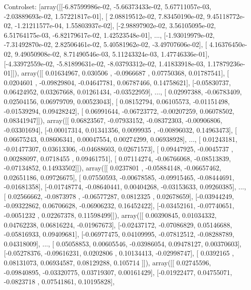 \documentclass{article}
\begin{document}
Controlset: [array([[-6.87599986e-02, -5.66373433e-02,  5.67711057e-03,
        -2.03889693e-02,  1.57221817e-01],
       [ 2.08819512e-02,  7.83450190e-02,  9.45118772e-02,
        -1.21211577e-04,  1.55803937e-02],
       [-2.98897902e-02,  3.56105095e-02,  6.51764175e-03,
        -6.82179617e-02,  1.42523548e-01],
       ...,
       [-1.93019979e-02, -7.31492870e-02,  2.82506461e-02,
         5.40581962e-02, -3.49707606e-02],
       [ 4.16376450e-02,  9.49050908e-02,  8.71490546e-03,
         5.11243324e-03,  1.47746336e-01],
       [-4.33972559e-02, -5.81899631e-02, -8.03793312e-02,
         1.41833918e-03,  1.17879236e-01]]), array([[ 0.01634967,  0.030506  , -0.0966687 ,  0.07750368,  0.01787541],
       [ 0.0204601 , -0.09829804, -0.04647781,  0.06787466,  0.14758621],
       [-0.05830737,  0.06424952,  0.03267668,  0.01261434, -0.03522959],
       ...,
       [ 0.02997388, -0.06783409,  0.02504156,  0.06979709,  0.00523043],
       [ 0.08152794,  0.06105573, -0.01151498, -0.01539294,  0.09428242],
       [ 0.06991644, -0.06723772, -0.00207259,  0.06078502,  0.08341947]]), array([[ 0.06823567, -0.07933152, -0.08372303, -0.00906806, -0.03301694],
       [-0.00017314,  0.01341356,  0.0099935 , -0.00896032,  0.14963473],
       [ 0.06675243,  0.08606341,  0.00047554,  0.00274299,  0.06938928],
       ...,
       [ 0.01243181, -0.01477307,  0.03613306, -0.04688603,  0.02671573],
       [ 0.09447925, -0.0045737 ,  0.00288097,  0.0718455 ,  0.09461751],
       [ 0.07114274, -0.06766068, -0.08513839, -0.07134852,  0.14933502]]), array([[ 0.0237801 , -0.05884148, -0.06657462,  0.02651186,  0.09726675],
       [ 0.07550593, -0.00678585, -0.09915465, -0.08444691, -0.01681358],
       [-0.01748774, -0.08640441,  0.00404268, -0.03153633,  0.09260385],
       ...,
       [ 0.02566662, -0.0873978 , -0.06577287,  0.0812325 ,  0.02678659],
       [-0.03944249, -0.09322862,  0.06706628, -0.06906232,  0.16452422],
       [-0.03452161, -0.07740651, -0.0051232 ,  0.02267378,  0.11598499]]), array([[ 0.00390845,  0.01034332,  0.04762238,  0.06816224, -0.01967673],
       [-0.02437172, -0.07086829,  0.05146688, -0.05816933,  0.09409681],
       [-0.06977475,  0.04109995, -0.07812512, -0.08288789,  0.04318009],
       ...,
       [ 0.05058853,  0.00605546, -0.03986054,  0.09478127,  0.00370603],
       [-0.05278376, -0.09616231,  0.0202806 ,  0.10134413, -0.02998747],
       [ 0.0392165 ,  0.08131073,  0.06934587,  0.08129288,  0.105714  ]]), array([[ 0.02745596, -0.09840895, -0.03320775,  0.03719307,  0.00161429],
       [-0.01922477,  0.04755071, -0.0823718 ,  0.07541861,  0.10195828],
\end{document}

